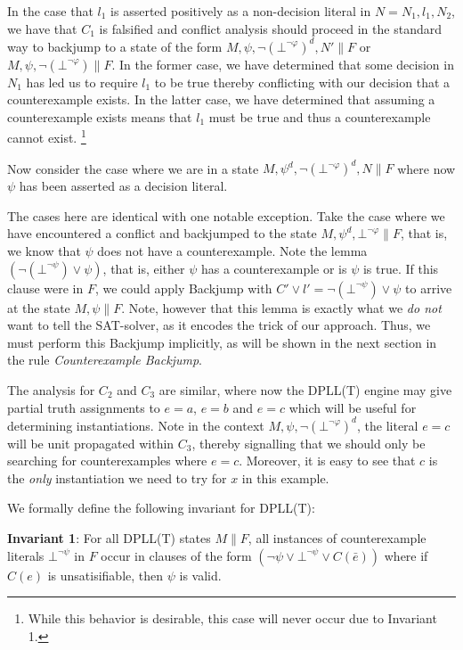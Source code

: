 \documentclass{llncs}
\begin{document}
In the case that $l_1$ is asserted positively as a non-decision literal in $N = N_1, l_1, N_2$, we have that $C_1$ is falsified and conflict analysis should proceed in the standard way to backjump to a state of the form $M, \psi, \neg( \bot^{\neg \varphi} )^d, N' \parallel F$ or $M, \psi, \neg( \bot^{\neg \varphi} )  \parallel F$.
In the former case, we have determined that some decision in $N_1$ has led us to require $l_1$ to be true thereby conflicting with our decision that a counterexample exists.
In the latter case, we have determined that assuming a counterexample exists means that $l_1$ must be true and thus a counterexample cannot exist.
\footnote{ While this behavior is desirable, this case will never occur due to Invariant 1.}

Now consider the case where we are in a state $M, \psi^d, \neg( \bot^{\neg \varphi} )^d, N  \parallel F$ where now $\psi$ has been asserted as a decision literal.

The cases here are identical with one notable exception.
Take the case where we have encountered a conflict and backjumped to the state $M, \psi^d, \bot^{\neg \varphi} \parallel F$, that is, we know that $\psi$ does not have a counterexample.
Note the lemma $(\neg (\bot^{\neg \psi}) \vee \psi)$, that is, either $\psi$ has a counterexample or is $\psi$ is true.
If this clause were in $F$, we could apply Backjump with $C' \vee l' = \neg (\bot^{\neg \psi}) \vee \psi$ to arrive at the state $M, \psi \parallel F$.
Note, however that this lemma is exactly what we \emph{do not} want to tell the SAT-solver, as it encodes the trick of our approach.
Thus, we must perform this Backjump implicitly, as will be shown in the next section in the rule \emph{Counterexample Backjump}.

The analysis for $C_2$ and $C_3$ are similar, where now the DPLL(T) engine may give partial truth assignments to $e = a$, $e = b$ and $e = c$ which will be useful for determining instantiations.
Note in the context $M, \psi, \neg( \bot^{\neg \varphi} )^d$, the literal $e = c$ will be unit propagated within $C_3$, thereby signalling that we should only be searching for counterexamples where $e = c$.
Moreover, it is easy to see that $c$ is the \emph{only} instantiation we need to try for $x$ in this example.

We formally define the following invariant for DPLL(T):

{\bf Invariant 1}:
For all DPLL(T) states $M \parallel F$, all instances of counterexample literals $\bot^{\neg \psi}$ in $F$ occur in clauses of the form $( \neg \psi \vee \bot^{\neg \psi} \vee C(\bar{e}) )$ where if $C(e)$ is unsatisifiable, then $\psi$ is valid. \\
\end{document}
